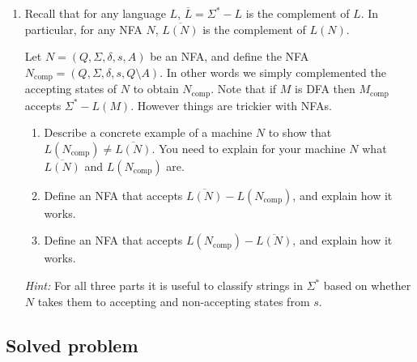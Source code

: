 \documentclass[11pt]{article}
\newcommand{\comp}[1]{#1_{\text{comp}}}
\begin{document}
\begin{enumerate}
\item Recall that for any language $L$, $\overline{L} = \Sigma^* -
  L$ is the complement of $L$.  In particular, for any NFA $N$,
  $\overline{L(N)}$ is the complement of $L(N)$.


  Let $N = (Q,\Sigma,\delta,s,A)$ be an NFA, and define the NFA
  $\comp{N} = (Q,\Sigma,\delta,s,Q\setminus A)$. In other words we
  simply complemented the accepting states of $N$ to obtain
  $\comp{N}$.  Note that if $M$ is DFA then $\comp{M}$ accepts
  $\Sigma^* - L(M)$. However things are trickier with NFAs.

\begin{enumerate}
\item Describe a concrete example of a machine $N$
  to show that $L(\comp{N}) \neq \overline{L(N)}$. You need
  to explain for your machine $N$ what $\overline{L(N)}$ and
  $L(\comp{N})$ are.

\item
Define an NFA that accepts 
$\overline{L(N)} - L(\comp{N})$, and explain how it works.

\item
Define an NFA that accepts 
$L(\comp{N}) - \overline{L(N)}$, and explain how it works.
\end{enumerate}

{\em Hint:} For all three parts it is useful to classify strings in $\Sigma^*$
based on whether $N$ takes them to accepting and non-accepting states
from $s$.


\end{enumerate}

\newpage
\subsection*{Solved problem}
\end{document}
